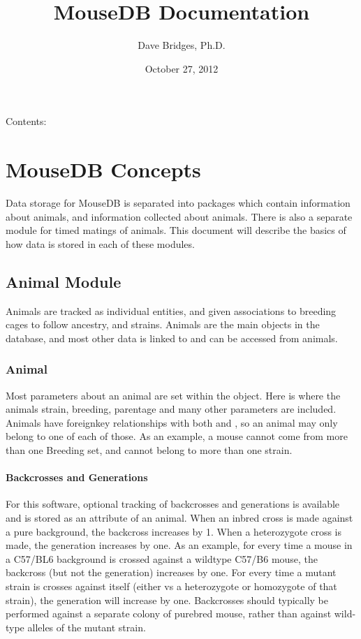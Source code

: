 \documentclass[letterpaper,10pt,english]{sphinxmanual}
\title{MouseDB Documentation}
\date{October 27, 2012}
\author{Dave Bridges, Ph.D.}
\begin{document}
\maketitle
\tableofcontents
{}\label{index::doc}


Contents:


\chapter{MouseDB Concepts}
\label{concepts:welcome-to-mousedb-s-documentation}\label{concepts::doc}\label{concepts:mousedb-concepts}
Data storage for MouseDB is separated into packages which contain information about animals, and information collected about animals.  There is also a separate module for timed matings of animals.  This document will describe the basics of how data is stored in each of these modules.


\section{Animal Module}
\label{concepts:animal-module}
Animals are tracked as individual entities, and given associations to breeding cages to follow ancestry, and strains.  Animals are the main objects in the database, and most other data is linked to and can be accessed from animals.


\subsection{Animal}
\label{concepts:animal}
Most parameters about an animal are set within the {\hyperref[animals:mousedb.animal.models.Animal]{}} object. Here is where the animals strain, breeding, parentage and many other parameters are included.  Animals have foreignkey relationships with both {\hyperref[animals:mousedb.animal.models.Strain]{}} and {\hyperref[animals:mousedb.animal.models.Breeding]{}}, so an animal may only belong to one of each of those.  As an example, a mouse cannot come from more than one Breeding set, and cannot belong to more than one strain.


\subsubsection{Backcrosses and Generations}
\label{concepts:backcrosses-and-generations}
For this software, optional tracking of backcrosses and generations is available and is stored as an attribute of an animal.  When an inbred cross is made against a pure background, the backcross increases by 1.  When a heterozygote cross is made, the generation increases by one.  As an example, for every time a mouse in a C57/BL6 background is crossed against a wildtype C57/B6 mouse, the backcross (but not the generation) increases by one.  For every time a mutant strain is crosses against itself (either vs a heterozygote or homozygote of that strain), the generation will increase by one.  Backcrosses should typically be performed against a separate colony of purebred mouse, rather than against wild-type alleles of the mutant strain.
\end{document}
